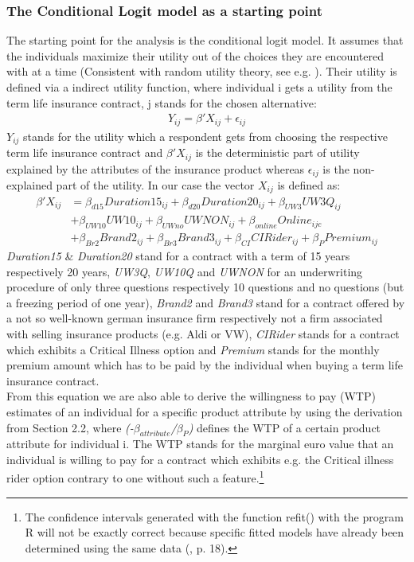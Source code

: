 \documentclass[12pt, abstracton]{article}
\begin{document}
\subsubsection{The Conditional Logit model as a starting point}
\label{cond_logit}
The starting point for the analysis is the conditional logit model. It assumes that the individuals maximize their utility out of the choices they are encountered with at a time (Consistent with random utility theory, see e.g. \cite{Thurstone1927}). Their utility is defined via a indirect utility function, where individual i gets a utility from the term life insurance contract, j stands for the chosen alternative:\\
\begin{align}
Y_{ij}= \beta' X_{ij} + \epsilon_{ij}
\end{align}
\textit{$Y_{ij}$} stands for the utility which a respondent gets from choosing the respective term life insurance contract and \textbf{$\beta' X_{ij}$} is the deterministic part of utility explained by the attributes of the insurance product whereas \textit{$\epsilon_{ij}$} is the non-explained part of the utility. 
In our case the vector \textbf{$X_{ij}$} is defined as:
\begin{equation}
\begin{split}
\beta' X_{ij} & = \beta_{d15} Duration15_{ij} + \beta_{d20} Duration20_{ij} + \beta_{UW3} UW3Q_{ij}\\
& + \beta_{UW10} UW10_{ij} + \beta_{UWno} UWNON_{ij} + \beta_{online} Online_{ijc} \\
& + \beta_{Br2} Brand2_{ij}
+ \beta_{Br3} Brand3_{ij}
+ \beta_{CI} CIRider_{ij}
+ \beta_{P} Premium_{ij}
\end{split}
\end{equation}
\textit{Duration15} \& \textit{Duration20} stand for a contract with a term of 15 years respectively 20 years, \textit{UW3Q}, \textit{UW10Q} and \textit{UWNON} for an underwriting procedure of only three questions respectively 10 questions and no questions (but a freezing period of one year), \textit{Brand2} and \textit{Brand3} stand for a contract offered by a not so well-known german insurance firm respectively not a firm associated with selling insurance products (e.g. Aldi or VW), \textit{CIRider} stands for a contract which exhibits a Critical Illness option and \textit{Premium} stands for the monthly premium amount which has to be paid by the individual when buying a term life insurance contract.\\
From this equation we are also able to derive the willingness to pay (WTP) estimates of an individual for a specific product attribute by using the derivation from Section 2.2, where \textit{(-$\beta_{attribute}$/$\beta_{P}$)} defines the WTP of a certain product attribute for individual i. The WTP stands for the marginal euro value that an individual is willing to pay for a contract which exhibits e.g. the Critical illness rider option contrary to one without such a feature.\footnote{The confidence intervals generated with the function refit() with the program R will not be exactly correct because specific fitted models have already been determined using the same data (\cite{Gruen2008}, p. 18).}\\
\end{document}
